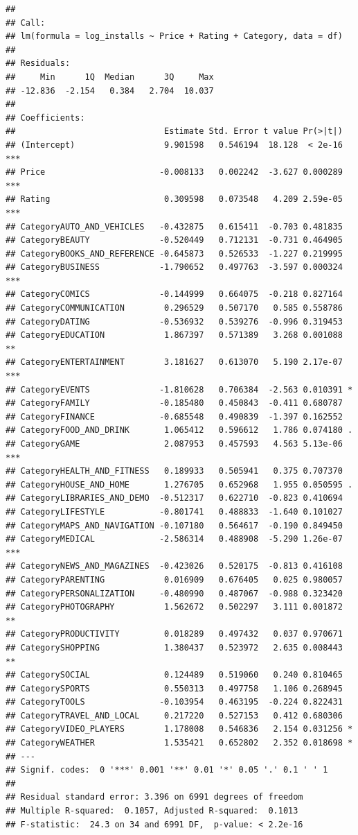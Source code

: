 \documentclass[
]{article}
\begin{document}
\begin{verbatim}
## 
## Call:
## lm(formula = log_installs ~ Price + Rating + Category, data = df)
## 
## Residuals:
##     Min      1Q  Median      3Q     Max 
## -12.836  -2.154   0.384   2.704  10.037 
## 
## Coefficients:
##                              Estimate Std. Error t value Pr(>|t|)    
## (Intercept)                  9.901598   0.546194  18.128  < 2e-16 ***
## Price                       -0.008133   0.002242  -3.627 0.000289 ***
## Rating                       0.309598   0.073548   4.209 2.59e-05 ***
## CategoryAUTO_AND_VEHICLES   -0.432875   0.615411  -0.703 0.481835    
## CategoryBEAUTY              -0.520449   0.712131  -0.731 0.464905    
## CategoryBOOKS_AND_REFERENCE -0.645873   0.526533  -1.227 0.219995    
## CategoryBUSINESS            -1.790652   0.497763  -3.597 0.000324 ***
## CategoryCOMICS              -0.144999   0.664075  -0.218 0.827164    
## CategoryCOMMUNICATION        0.296529   0.507170   0.585 0.558786    
## CategoryDATING              -0.536932   0.539276  -0.996 0.319453    
## CategoryEDUCATION            1.867397   0.571389   3.268 0.001088 ** 
## CategoryENTERTAINMENT        3.181627   0.613070   5.190 2.17e-07 ***
## CategoryEVENTS              -1.810628   0.706384  -2.563 0.010391 *  
## CategoryFAMILY              -0.185480   0.450843  -0.411 0.680787    
## CategoryFINANCE             -0.685548   0.490839  -1.397 0.162552    
## CategoryFOOD_AND_DRINK       1.065412   0.596612   1.786 0.074180 .  
## CategoryGAME                 2.087953   0.457593   4.563 5.13e-06 ***
## CategoryHEALTH_AND_FITNESS   0.189933   0.505941   0.375 0.707370    
## CategoryHOUSE_AND_HOME       1.276705   0.652968   1.955 0.050595 .  
## CategoryLIBRARIES_AND_DEMO  -0.512317   0.622710  -0.823 0.410694    
## CategoryLIFESTYLE           -0.801741   0.488833  -1.640 0.101027    
## CategoryMAPS_AND_NAVIGATION -0.107180   0.564617  -0.190 0.849450    
## CategoryMEDICAL             -2.586314   0.488908  -5.290 1.26e-07 ***
## CategoryNEWS_AND_MAGAZINES  -0.423026   0.520175  -0.813 0.416108    
## CategoryPARENTING            0.016909   0.676405   0.025 0.980057    
## CategoryPERSONALIZATION     -0.480990   0.487067  -0.988 0.323420    
## CategoryPHOTOGRAPHY          1.562672   0.502297   3.111 0.001872 ** 
## CategoryPRODUCTIVITY         0.018289   0.497432   0.037 0.970671    
## CategorySHOPPING             1.380437   0.523972   2.635 0.008443 ** 
## CategorySOCIAL               0.124489   0.519060   0.240 0.810465    
## CategorySPORTS               0.550313   0.497758   1.106 0.268945    
## CategoryTOOLS               -0.103954   0.463195  -0.224 0.822431    
## CategoryTRAVEL_AND_LOCAL     0.217220   0.527153   0.412 0.680306    
## CategoryVIDEO_PLAYERS        1.178008   0.546836   2.154 0.031256 *  
## CategoryWEATHER              1.535421   0.652802   2.352 0.018698 *  
## ---
## Signif. codes:  0 '***' 0.001 '**' 0.01 '*' 0.05 '.' 0.1 ' ' 1
## 
## Residual standard error: 3.396 on 6991 degrees of freedom
## Multiple R-squared:  0.1057, Adjusted R-squared:  0.1013 
## F-statistic:  24.3 on 34 and 6991 DF,  p-value: < 2.2e-16
\end{verbatim}
\end{document}
